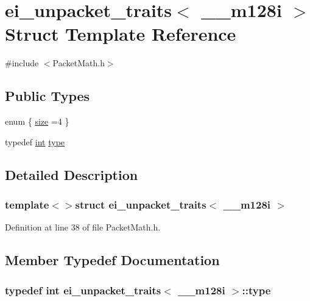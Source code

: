 \hypertarget{structei__unpacket__traits_3_01____m128i_01_4}{\section{ei\-\_\-unpacket\-\_\-traits$<$ \-\_\-\-\_\-m128i $>$ Struct Template Reference}
\label{structei__unpacket__traits_3_01____m128i_01_4}
}


{\ttfamily \#include $<$Packet\-Math.\-h$>$}

\subsection*{Public Types}
\begin{DoxyCompactItemize}
\item 
enum \{ \hyperlink{structei__unpacket__traits_3_01____m128i_01_4_a3eff71c475feba70f4b391ff2f6314a1a7cdffa5be4818a4ff974975601b253c4}{size} =4
 \}
\item 
typedef \hyperlink{ioapi_8h_a787fa3cf048117ba7123753c1e74fcd6}{int} \hyperlink{structei__unpacket__traits_3_01____m128i_01_4_a1f4875cacf60c862e162b95b87b330b2}{type}
\end{DoxyCompactItemize}


\subsection{Detailed Description}
\subsubsection*{template$<$$>$struct ei\-\_\-unpacket\-\_\-traits$<$ \-\_\-\-\_\-m128i $>$}



Definition at line 38 of file Packet\-Math.\-h.



\subsection{Member Typedef Documentation}
\hypertarget{structei__unpacket__traits_3_01____m128i_01_4_a1f4875cacf60c862e162b95b87b330b2}{
\subsubsection[{type}]{\setlength{\rightskip}{0pt plus 5cm}typedef {\bf int} {\bf ei\-\_\-unpacket\-\_\-traits}$<$ \-\_\-\-\_\-m128i $>$\-::{\bf type}}}\label{structei__unpacket__traits_3_01____m128i_01_4_a1f4875cacf60c862e162b95b87b330b2}


